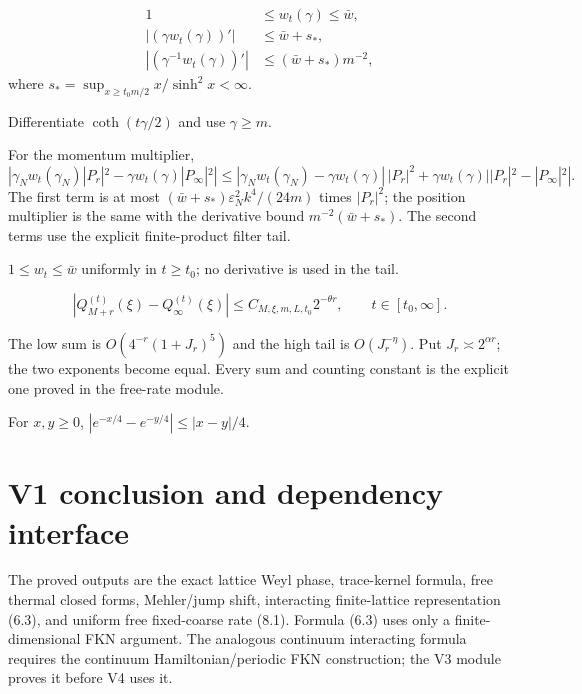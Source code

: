 \documentclass[11pt,a4paper]{article}
\newcommand{\eps}{\varepsilon}
\begin{document}
\begin{align*}
 1&\le w_t(\gamma)\le\bar w,\\
 |(\gamma w_t(\gamma))'|&\le\bar w+s_*,\\
 |(\gamma^{-1}w_t(\gamma))'|&\le(\bar w+s_*)m^{-2},
\end{align*}
where $s_*=\sup_{x\ge t_0m/2}x/\sinh^2x<\infty$.

\Because Differentiate $\coth(t\gamma/2)$ and use $\gamma\ge m$.


\Because For the momentum multiplier,
\[
 |\gamma_Nw_t(\gamma_N)|P_r|^2-\gamma w_t(\gamma)|P_\infty|^2|
 \le |\gamma_Nw_t(\gamma_N)-\gamma w_t(\gamma)|\,|P_r|^2
 +\gamma w_t(\gamma)||P_r|^2-|P_\infty|^2|.
\]
The first term is at most
$(\bar w+s_*)\eps_N^2k^4/(24m)$ times $|P_r|^2$; the position multiplier is
the same with the derivative bound $m^{-2}(\bar w+s_*)$.  The second terms use
the explicit finite-product filter tail.


\Because $1\le w_t\le\bar w$ uniformly in $t\ge t_0$; no derivative is used in
the tail.

\[
 |Q_{M+r}^{(t)}(\xi)-Q_\infty^{(t)}(\xi)|
 \le C_{M,\xi,m,L,t_0}2^{-\theta r},\qquad t\in[t_0,\infty].\tag{8.1}
\]

\Because The low sum is $O(4^{-r}(1+J_r)^5)$ and the high tail is
$O(J_r^{-\eta})$.  Put $J_r\asymp2^{\alpha r}$; the two exponents become equal.
Every sum and counting constant is the explicit one proved in the free-rate module.


\Because For $x,y\ge0$, $|e^{-x/4}-e^{-y/4}|\le|x-y|/4$.

\QedStep

\section{V1 conclusion and dependency interface}

The proved outputs are the exact lattice Weyl phase, trace-kernel formula, free thermal
closed forms, Mehler/jump shift, interacting finite-lattice representation (6.3), and
uniform free fixed-coarse rate (8.1).  Formula (6.3) uses only a finite-dimensional
FKN argument.  The analogous continuum interacting formula requires the continuum
Hamiltonian/periodic FKN construction; the V3 module proves it before V4 uses it.
\end{document}
